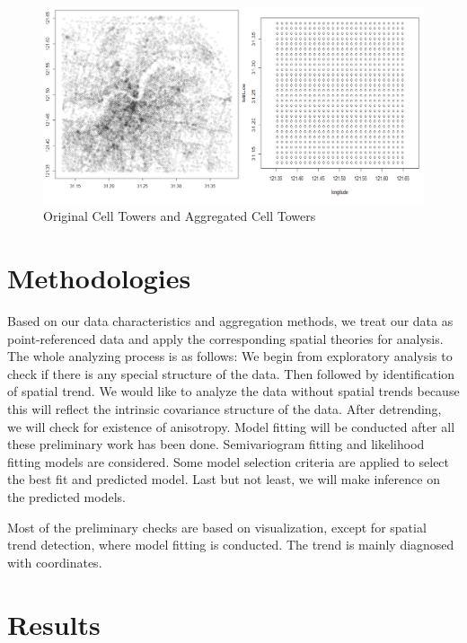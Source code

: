 \documentclass[hidelinks,12pt]{article}
\begin{document}
	\begin{figure}[!ht]
		\includegraphics[width=\textwidth]{tower.png}
		\caption{Original Cell Towers and Aggregated Cell Towers \label{fig:tower}}
	\end{figure}
	
	\section{Methodologies}\label{sec:meth}
	Based on our data characteristics and aggregation methods, we treat our data as point-referenced data and apply the corresponding spatial theories for analysis. The whole analyzing process is as follows: We begin from exploratory analysis to check if there is any special structure of the data. Then followed by identification of spatial trend. We would like to analyze the data without spatial trends because this will reflect the intrinsic covariance structure of the data. After detrending, we will check for existence of anisotropy. Model fitting will be conducted after all these preliminary work has been done. Semivariogram fitting and likelihood fitting models are considered. Some model selection criteria are applied to select the best fit and predicted model. Last but not least, we will make inference on the predicted models.
	
	Most of the preliminary checks are based on visualization, except for spatial trend detection, where model fitting is conducted. The trend is mainly diagnosed with coordinates.
	
	\section{Results}\label{sec:res}
\end{document}
